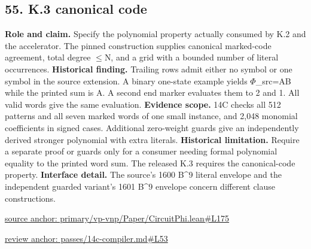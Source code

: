 \documentclass[11pt,letterpaper]{article}
\theoremstyle{definition}\newtheorem{definition}[theorem]{Definition}\newtheorem{example}[theorem]{Example}
\theoremstyle{remark}\newtheorem{remark}[theorem]{Remark}
\begin{document}
\subsection*{55. K.3 canonical code}
\textbf{Role and claim.} Specify the polynomial property actually consumed by K.2 and the accelerator. The pinned construction supplies canonical marked-code agreement, total degree \ensuremath{\le}N, and a grid with a bounded number of literal occurrences.
\textbf{Historical finding.} Trailing rows admit either no symbol or one symbol in the source extension. A binary one-state example yields \ensuremath{\Phi}\_src=AB while the printed sum is A. A second end marker evaluates them to 2 and 1. All valid words give the same evaluation.
\textbf{Evidence scope.} 14C checks all 512 patterns and all seven marked words of one small instance, and 2,048 monomial coefficients in signed cases. Additional zero-weight guards give an independently derived stronger polynomial with extra literals.
\textbf{Historical limitation.} Require a separate proof or guards only for a consumer needing formal polynomial equality to the printed word sum. The released K.3 requires the canonical-code property.
\textbf{Interface detail.} The source's 1600 B\textasciicircum{}9 literal envelope and the independent guarded variant's 1601 B\textasciicircum{}9 envelope concern different clause constructions.
\par\href{https://github.com/nousentllc/VP-VNP-Review/blob/8a7976933b6b2b4ffda1ad3a0dfb5fc6b6f023e8/primary/vp-vnp/Paper/CircuitPhi.lean\#L175}{source anchor: primary/vp-vnp/Paper/CircuitPhi.lean\#L175}
\par\href{https://github.com/nousentllc/VP-VNP-Review/blob/8a7976933b6b2b4ffda1ad3a0dfb5fc6b6f023e8/passes/14c-compiler.md\#L53}{review anchor: passes/14c-compiler.md\#L53}
\goodbreak
{}
\hypertarget{claim.56}{}
\end{document}
